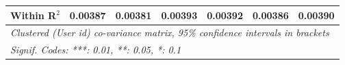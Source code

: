 \begin{table}[htbp]
\begin{threeparttable}[b]
\begin{tabular}{lcccccc}
         Within R$^2$                    & 0.00387          & 0.00381          & 0.00393          & 0.00392          & 0.00386          & 0.00390\\  
         \midrule \midrule
         \multicolumn{7}{l}{\emph{Clustered (User id) co-variance matrix, 95\% confidence intervals in brackets}}\\
         \multicolumn{7}{l}{\emph{Signif. Codes: ***: 0.01, **: 0.05, *: 0.1}}\\
      \end{tabular}
   \end{threeparttable}
\end{table}


